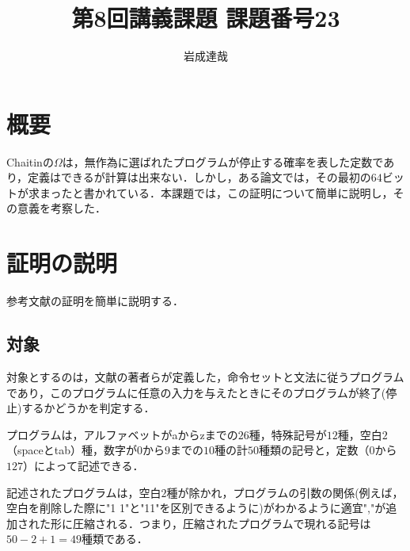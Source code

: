 \documentclass{jarticle}
\title{第8回講義課題 課題番号23}
\date{\todayd}
\author{岩成達哉}
\begin{document}
\begin{titlepage}
	\setlength{\topmargin}{1.1in}
	\vspace{100mm}
	\maketitle
\end{titlepage}

\begin{comment}
（第８回講義：15点：課題番号23） 驚くべきことに、ChaitinのΩ(最も知られていない数)について、ある種のチューリングマシン（self-delimiting Turing machines）ではΩの最初の64ビットが 次のように求められている。
0000001000000100000110001000011010001111110010111011101000010000

これについてその証明を簡単に説明し、その意義（論理的矛盾、正確に求められていいのか？、など）について 考察せよ。 以下の論文などが参考になる。

Calude,C.S., Dinneen,M.J. and Shu,C.-K., “Computing a Glimpse of Randomness,” Experimental Mathematics, vol.11, pp.361-370, 2002.
\end{comment}


\section{概要}
Chaitinの$\Omega$は，無作為に選ばれたプログラムが停止する確率を表した定数であり，定義はできるが計算は出来ない．しかし，ある論文では，その最初の$64$ビットが求まったと書かれている．本課題では，この証明について簡単に説明し，その意義を考察した．



\section{証明の説明}
参考文献\cite{ref:omega}の証明を簡単に説明する．

\subsection{対象}
対象とするのは，文献\cite{ref:omega}の著者らが定義した，命令セットと文法に従うプログラムであり，このプログラムに任意の入力を与えたときにそのプログラムが終了(停止)するかどうかを判定する．

プログラムは，アルファベットがaからzまでの$26$種，特殊記号が$12$種，空白$2$（spaceとtab）種，数字が$0$から$9$までの$10$種の計$50$種類の記号と，定数（$0$から$127$）によって記述できる．

記述されたプログラムは，空白$2$種が除かれ，プログラムの引数の関係(例えば，空白を削除した際に"1 1"と"11"を区別できるように)がわかるように適宜","が追加された形に圧縮される．つまり，圧縮されたプログラムで現れる記号は$50-2+1=49$種類である．
\end{document}
